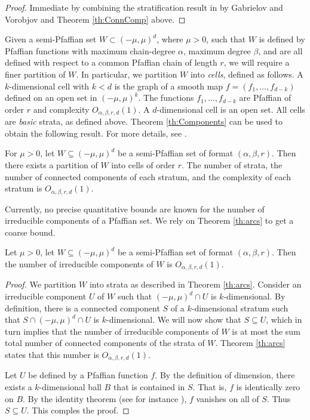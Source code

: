 \documentclass[11pt]{article}
\theoremstyle{definition}
\begin{document}
\begin{proof}
Immediate by combining the stratification result in \cite[Theorem 2]{GV95} by Gabrielov and Vorobjov and Theorem \ref{th:ConnComp} above.
\end{proof}

Given a semi-Pfaffian set $W\subset (-\mu, \mu)^d$, where $\mu > 0$, such that $W$ is defined by Pfaffian functions with maximum chain-degree $\alpha$, maximum degree $\beta$, and are all defined with respect to a common Pfaffian chain of length $r$, we will require a finer partition of $W$. 
In particular, we partition $W$ into \emph{cells}, defined as follows.
A $k$-dimensional cell with $k < d$ is the graph of a smooth map $f = (f_1,\ldots , f_{d-k})$ defined on an open set in $(-\mu, \mu)^k$. 
The functions $f_1,\ldots , f_{d-k}$ are Pfaffian of order $r$ and complexity $O_{\alpha,\beta,r,d}(1)$.
A $d$-dimensional cell is an open set.
All cells are \emph{basic} strata, as defined above. 
Theorem \ref{th:Components} can be used to obtain the following result.
For more details, see \cite[Lemma 3.1]{LNV24}.

\begin{theorem} \label{th:arcs}
For $\mu > 0$, let $W \subseteq (-\mu, \mu)^d$ be a semi-Pfaffian set of format $(\alpha,\beta,r)$.
Then there exists a partition of $W$ into cells of order $r$. The number of strata, the number of connected components of each stratum, and the complexity of each stratum is 
$O_{\alpha, \beta,r,d}(1)$.
\end{theorem}

Currently, no precise quantitative bounds are known for the number of irreducible components of a Pfaffian set. 
We rely on Theorem \ref{th:arcs} to get a coarse bound. 

\begin{corollary} \label{co:irreducible}
Let $\mu > 0$, let $W \subseteq (-\mu, \mu)^d$ be a semi-Pfaffian set of format $(\alpha,\beta,r)$.
Then the number of irreducible components of $W$ is $O_{\alpha, \beta,r,d}(1)$.
\end{corollary}
\begin{proof}
We partition $W$ into strata as described in Theorem \ref{th:arcs}. Consider an irreducible component $U$ of $W$ such that $(-\mu, \mu)^d \cap U$ is $k$-dimensional. By definition, there is a connected component $S$ of a $k$-dimensional stratum such that $S \cap (-\mu, \mu)^d \cap U$ is $k$-dimensional. We will now show that $S \subseteq U$, which in turn implies that the number of irreducible components of $W$ is at most the sum total number of connected components of the strata of $W$. Theorem \ref{th:arcs} states that this number is $O_{\alpha, \beta, r, d}(1)$.

Let $U$ be defined by a Pfaffian function $f$. By the definition of dimension, there exists a $k$-dimensional ball $B$ that is contained in $S$. That is, $f$ is identically zero on $B$. By the identity theorem (see for instance \cite[Section 1.2]{KP02}), $f$ vanishes on all of $S$. Thus $S \subseteq U$. This comples the proof.
\end{proof}
\end{document}
